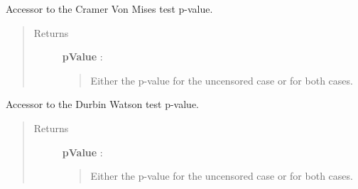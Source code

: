 \documentclass[letterpaper,10pt,english]{sphinxmanual}
\begin{document}
\begin{fulllineitems}
\begin{fulllineitems}
\label{_generated/otpod.UnivariateLinearModelAnalysis:otpod.UnivariateLinearModelAnalysis.getCramerVonMisesPValue}
Accessor to the Cramer Von Mises test p-value.
\begin{quote}\begin{description}
\item[{Returns}] \leavevmode
\textbf{pValue} : \href{http://doc.openturns.org/openturns-latest/sphinx/user\_manual/\_generated/openturns.NumericalPoint.html\#openturns.NumericalPoint}{}
\begin{quote}

Either the p-value for the uncensored case or for both cases.
\end{quote}

\end{description}\end{quote}

\end{fulllineitems}


\begin{fulllineitems}
\label{_generated/otpod.UnivariateLinearModelAnalysis:otpod.UnivariateLinearModelAnalysis.getDurbinWatsonPValue}
Accessor to the Durbin Watson test p-value.
\begin{quote}\begin{description}
\item[{Returns}] \leavevmode
\textbf{pValue} : \href{http://doc.openturns.org/openturns-latest/sphinx/user\_manual/\_generated/openturns.NumericalPoint.html\#openturns.NumericalPoint}{}
\begin{quote}

Either the p-value for the uncensored case or for both cases.
\end{quote}

\end{description}\end{quote}

\end{fulllineitems}



\end{fulllineitems}
\end{document}
